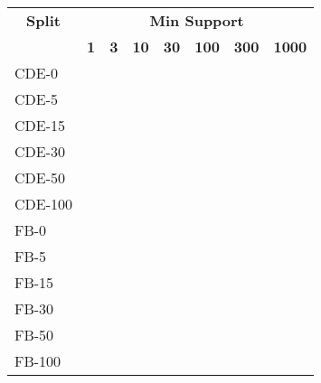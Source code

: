 \begin{tabular}{| l | r | r | r | r | r | r | r |}
    \hline

    \multicolumn{1}{|c|}{\textbf{Split}} &
    \multicolumn{7}{|c|}{\textbf{Min Support}} \\

    \multicolumn{1}{|c|}{} &
    \multicolumn{1}{|c|}{\textbf{1}} &
    \multicolumn{1}{|c|}{\textbf{3}} &
    \multicolumn{1}{|c|}{\textbf{10}} &
    \multicolumn{1}{|c|}{\textbf{30}} &
    \multicolumn{1}{|c|}{\textbf{100}} &
    \multicolumn{1}{|c|}{\textbf{300}} &
    \multicolumn{1}{|c|}{\textbf{1000}} \\

    \hline \hline

    CDE-0   &  &  &  &  &  &  &  \\
    CDE-5   &  &  &  &  &  &  &  \\
    CDE-15  &  &  &  &  &  &  &  \\
    CDE-30  &  &  &  &  &  &  &  \\
    CDE-50  &  &  &  &  &  &  &  \\
    CDE-100 &  &  &  &  &  &  &  \\

    \hline

    FB-0    &  &  &  &  &  &  &  \\
    FB-5    &  &  &  &  &  &  &  \\
    FB-15   &  &  &  &  &  &  &  \\
    FB-30   &  &  &  &  &  &  &  \\
    FB-50   &  &  &  &  &  &  &  \\
    FB-100  &  &  &  &  &  &  &  \\

    \hline
\end{tabular}
